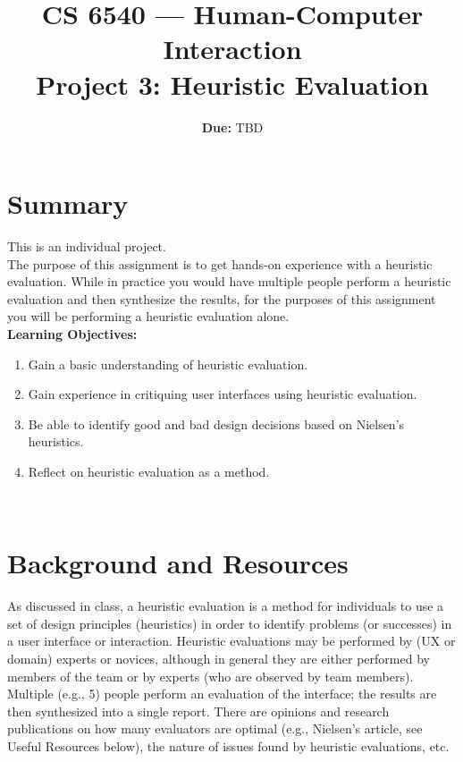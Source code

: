 \documentclass{article}
\title{CS 6540 --- Human-Computer Interaction\\\textbf{Project 3: Heuristic Evaluation}}
\author{ }
\date{\textbf{Due:} TBD}
\begin{document}
\maketitle

\section{Summary}

This is an individual project.\\

The purpose of this assignment is to get hands-on experience with a heuristic evaluation. While in practice you would have multiple people perform a heuristic evaluation and then synthesize the results, for the purposes of this assignment you will be performing a heuristic evaluation alone.\\

\textbf{Learning Objectives:}
\begin{enumerate}
    \item Gain a basic understanding of heuristic evaluation.
    \item Gain experience in critiquing user interfaces using heuristic evaluation.
    \item Be able to identify good and bad design decisions based on Nielsen's heuristics.
    \item Reflect on heuristic evaluation as a method.
\end{enumerate}\\


\section{Background and Resources}
As discussed in class, a heuristic evaluation is a method for individuals to use a set of design principles (heuristics) in order to identify problems (or successes) in a user interface or interaction. Heuristic evaluations may be performed by (UX or domain) experts or novices, although in general they are either performed by members of the team or by experts (who are observed by team members). Multiple (e.g., 5) people perform an evaluation of the interface; the results are then synthesized into a single report. There are opinions and research publications on how many evaluators are optimal (e.g., Nielsen's article, see Useful Resources below), the nature of issues found by heuristic evaluations, etc.\\
\end{document}
